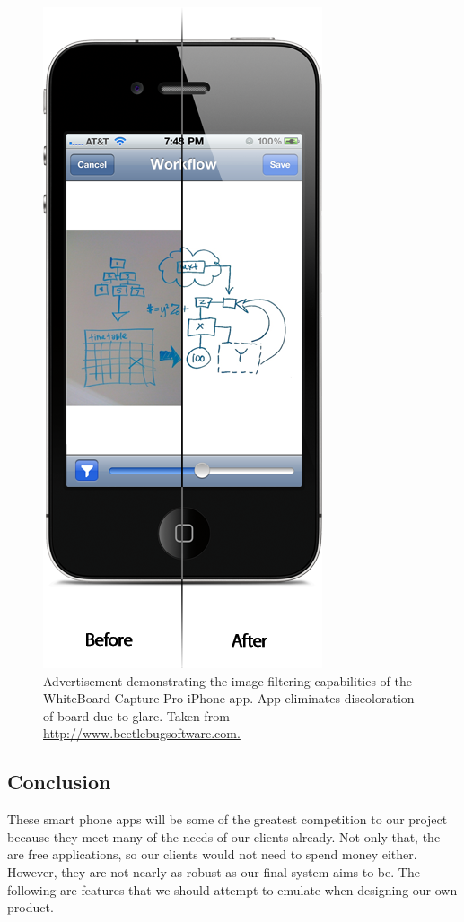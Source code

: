 \documentclass{article}
\begin{document}
			\begin{figure}
	      			\centering
	      			\includegraphics[scale=0.3]{./images/wbcp-example-ad.png}
				\caption{Advertisement demonstrating the image filtering capabilities of the WhiteBoard Capture Pro iPhone app. App eliminates discoloration of board due to glare. Taken from \url{http://www.beetlebugsoftware.com.}}
				\label{fig:wbcp-example-ad}
	   		 \end{figure}

     \subsection*{Conclusion}
These smart phone apps will be some of the greatest competition to our project because they meet many of the needs of our clients already. Not only that, the are free applications, so our clients would not need to spend money either. However, they are not nearly as robust as our final system aims to be. The following are features that we should attempt to emulate when designing our own product.
\end{document}
